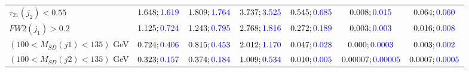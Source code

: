 \begin{landscape}
\begin{table}
\begin{tabular}{lcccccc}
			\rowcolor{black!7}$\tau_{21}(j_2)<0.55$ &$1.648;\textcolor{blue}{1.619}$ &$1.809;\textcolor{blue}{1.764}$ &$3.737;\textcolor{blue}{3.525}$&$0.545;\textcolor{blue}{0.685}$&$0.008;\textcolor{blue}{0.015}$&$0.064;\textcolor{blue}{0.060}$\\
			$FW2(j_1)>0.2$ &$1.125;\textcolor{blue}{0.724}$ &$1.243;\textcolor{blue}{0.795}$&$2.768;\textcolor{blue}{1.816}$&$0.272;\textcolor{blue}{0.189}$&$0.003;\textcolor{blue}{0.003}$&$0.016;\textcolor{blue}{0.008}$\\
			\rowcolor{black!7}$(100<M_{SD}(j1)<135)$ GeV& $0.724;\textcolor{blue}{0.406}$&$0.815;\textcolor{blue}{0.453}$&$2.012;\textcolor{blue}{1.170}$&$0.047;\textcolor{blue}{0.028}$&$0.000;\textcolor{blue}{0.0003}$&$0.003;\textcolor{blue}{0.002}$\\
			$(100<M_{SD}(j2)<135)$ GeV &$0.323;\textcolor{blue}{0.157}$ &$0.374;\textcolor{blue}{0.184}$ &$1.009;\textcolor{blue}{0.534}$&$0.010;\textcolor{blue}{0.005}$&$0.00007;\textcolor{blue}{0.00005}$&$0.0007;\textcolor{blue}{0.0005}$\\
			\bottomrule
		\end{tabular}
	\end{table}


\end{landscape}
